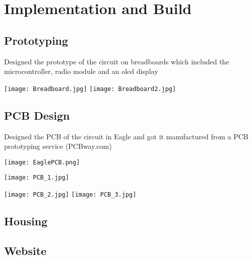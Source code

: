 \chapter{Implementation and Build}

\section{Prototyping}
Designed the prototype of the circuit on breadboards which included the microcontroller, radio module and an oled display

\texttt{[image: Breadboard.jpg]}
\texttt{[image: Breadboard2.jpg]}

\section{PCB Design}
Designed the PCB of the circuit in Eagle and got it manufactured from a PCB prototyping service (PCBway.com)

\texttt{[image: EaglePCB.png]}

\texttt{[image: PCB\_1.jpg]}

\newline
\texttt{[image: PCB\_2.jpg]}
\texttt{[image: PCB\_3.jpg]}

\section{Housing}

\section{Website}

